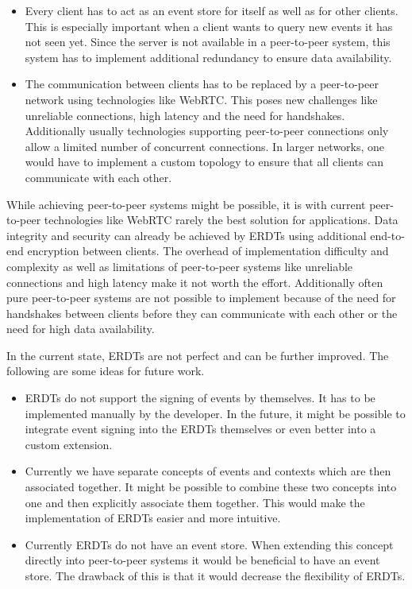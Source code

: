 \documentclass[
	english,
	ruledheaders=section,   %
	class=report,		    %
	thesis={type=bachelor}, %
	accentcolor=9c,			%
	custommargins=true,    %
	marginpar=false,        %
	parskip=half-,          %
	fontsize=11pt,          %
]{tudapub}
\begin{document}
\begin{itemize}
  \item Every client has to act as an event store for itself as well as for other clients. This is especially important when a client wants to query new events it has not seen yet. Since the server is not available in a peer-to-peer system, this system has to implement additional redundancy to ensure data availability.
  \item The communication between clients has to be replaced by a peer-to-peer network using technologies like WebRTC. This poses new challenges like unreliable connections, high latency and the need for handshakes. Additionally usually technologies supporting peer-to-peer connections only allow a limited number of concurrent connections. In larger networks, one would have to implement a custom topology to ensure that all clients can communicate with each other.
\end{itemize}

While achieving peer-to-peer systems might be possible, it is with current peer-to-peer technologies like WebRTC rarely the best solution for applications. Data integrity and security can already be achieved by ERDTs using additional end-to-end encryption between clients. The overhead of implementation difficulty and complexity as well as limitations of peer-to-peer systems like unreliable connections and high latency make it not worth the effort. Additionally often pure peer-to-peer systems are not possible to implement because of the need for handshakes between clients before they can communicate with each other or the need for high data availability.

In the current state, ERDTs are not perfect and can be further improved. The following are some ideas for future work.

\begin{itemize}
  \item ERDTs do not support the signing of events by themselves. It has to be implemented manually by the developer. In the future, it might be possible to integrate event signing into the ERDTs themselves or even better into a custom extension.
  \item Currently we have separate concepts of events and contexts which are then associated together. It might be possible to combine these two concepts into one and then explicitly associate them together. This would make the implementation of ERDTs easier and more intuitive.
  \item Currently ERDTs do not have an event store. When extending this concept directly into peer-to-peer systems it would be beneficial to have an event store. The drawback of this is that it would decrease the flexibility of ERDTs.
\end{itemize}
\end{document}

